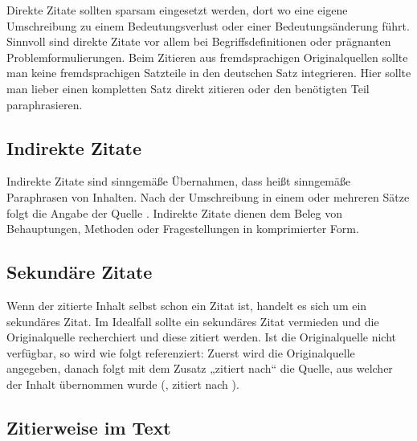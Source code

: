 Direkte Zitate sollten sparsam eingesetzt werden, dort wo eine eigene Umschreibung zu einem Bedeutungsverlust oder einer Bedeutungsänderung führt. Sinnvoll sind direkte Zitate vor allem bei Begriffsdefinitionen oder prägnanten Problemformulierungen. Beim Zitieren aus fremdsprachigen Originalquellen sollte man keine fremdsprachigen Satzteile  in den deutschen Satz integrieren. Hier sollte man lieber einen kompletten Satz direkt zitieren oder den benötigten Teil paraphrasieren.

\subsection{Indirekte Zitate}\label{subsubsec:indirekte}

Indirekte Zitate sind sinngemäße Übernahmen, dass heißt sinngemäße Paraphrasen von Inhalten. Nach der Umschreibung in einem oder mehreren Sätze folgt die Angabe der Quelle \cite[S. 11]{mustermann2013test}. Indirekte Zitate dienen dem Beleg von Behauptungen, Methoden oder Fragestellungen in komprimierter Form.

\subsection{Sekundäre Zitate}\label{subsubsec:sekundäre}

Wenn der zitierte Inhalt selbst schon ein Zitat ist, handelt es sich um ein sekundäres Zitat. Im Idealfall sollte ein sekundäres Zitat vermieden und die Originalquelle recherchiert und diese zitiert werden. Ist die Originalquelle nicht verfügbar, so wird wie folgt referenziert: Zuerst wird die Originalquelle angegeben, danach folgt mit dem Zusatz „zitiert nach“ die Quelle, aus welcher der Inhalt übernommen wurde (\citealp[S. 11]{mustermann2013test}, zitiert nach \citealp[S. 11]{huber2013buch}).

\subsection{Zitierweise im Text}\label{subsubsec:zitierweise}

